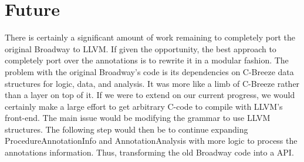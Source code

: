 \chapter{Future}\label{sec:future}
There is certainly a significant amount of work remaining to completely port the original Broadway to LLVM. If given the opportunity, the best approach to  completely port over the annotations is to rewrite it in a modular fashion. The problem with the original Broadway's code is its dependencies on C-Breeze data structures for logic, data, and analysis. It was more like a limb of C-Breeze rather than a layer on top of it. If we were to extend on our current progress, we would certainly make a large effort to get arbitrary C-code to compile with LLVM's front-end. The main issue would be modifying the grammar  to use LLVM structures. The following step would then be to continue expanding ProcedureAnnotationInfo and AnnotationAnalysis with more logic to process the annotations information. Thus, transforming the old Broadway code into a API.